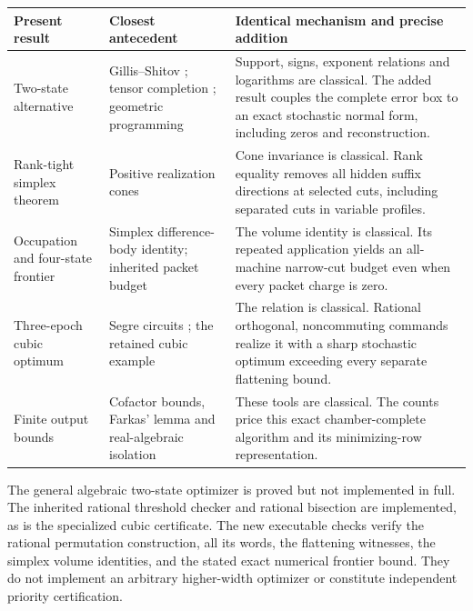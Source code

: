 \begin{center}\small
\begin{tabular}{p{}p{}p{}}
\toprule
Present result & Closest antecedent & Identical mechanism and precise addition\\
\midrule
Two-state alternative & Gillis--Shitov \cite{GS19}; tensor completion
\cite{KKKR17}; geometric programming \cite{BKVH07}
& Support, signs, exponent relations and logarithms are classical.
The added result couples the complete error box to an exact stochastic
normal form, including zeros and reconstruction.\\[3pt]
Rank-tight simplex theorem & Positive realization cones \cite{BF04}
& Cone invariance is classical. Rank equality removes all hidden suffix
directions at selected cuts, including separated cuts in variable profiles.\\[3pt]
Occupation and four-state frontier & Simplex difference-body identity;
inherited packet budget
& The volume identity is classical. Its repeated application yields an
all-machine narrow-cut budget even when every packet charge is zero.\\[3pt]
Three-epoch cubic optimum & Segre circuits \cite{KKKR17}; the retained cubic example
& The relation is classical. Rational orthogonal, noncommuting commands
realize it with a sharp stochastic optimum exceeding every separate
flattening bound.\\[3pt]
Finite output bounds & Cofactor bounds, Farkas' lemma and real-algebraic isolation
& These tools are classical. The counts price this exact chamber-complete
algorithm and its minimizing-row representation.\\
\bottomrule
\end{tabular}
\end{center}

The general algebraic two-state optimizer is proved but not implemented
in full. The inherited rational threshold checker and rational
bisection are implemented, as is the specialized cubic certificate.
The new executable checks verify the rational permutation construction,
all its words, the flattening witnesses, the simplex volume identities,
and the stated exact numerical frontier bound. They do not implement
an arbitrary higher-width optimizer or constitute independent priority
certification.

